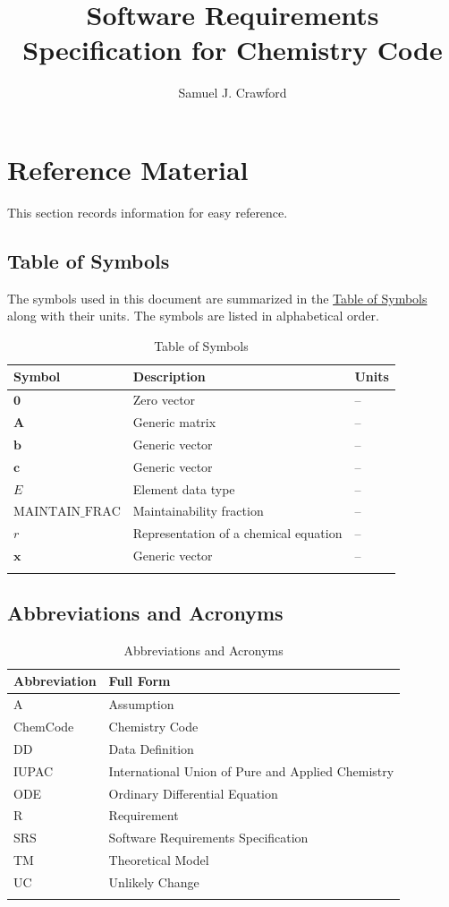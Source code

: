 \documentclass[12pt]{article}
\title{Software Requirements Specification for Chemistry Code}
\author{Samuel J. Crawford}
\begin{document}
\maketitle
\tableofcontents
\newpage
\section{Reference Material}
\label{Sec:RefMat}
This section records information for easy reference.

\subsection{Table of Symbols}
\label{Sec:ToS}
The symbols used in this document are summarized in the \hyperref[Table:ToS]{Table of Symbols} along with their units. The symbols are listed in alphabetical order.

\begin{longtable}{l l l}
\toprule
\textbf{Symbol} & \textbf{Description} & \textbf{Units}
\\
\midrule
\endhead
$\symbf{0}$ & Zero vector & --
\\
$\symbf{A}$ & Generic matrix & --
\\
$\symbf{b}$ & Generic vector & --
\\
$\symbf{c}$ & Generic vector & --
\\
$E$ & Element data type & --
\\
$\text{MAINTAIN_FRAC}$ & Maintainability fraction & --
\\
$r$ & Representation of a chemical equation & --
\\
$\symbf{x}$ & Generic vector & --
\\
\bottomrule
\caption{Table of Symbols}
\label{Table:ToS}
\end{longtable}
\subsection{Abbreviations and Acronyms}
\label{Sec:TAbbAcc}
\begin{longtable}{l l}
\toprule
\textbf{Abbreviation} & \textbf{Full Form}
\\
\midrule
\endhead
A & Assumption
\\
ChemCode & Chemistry Code
\\
DD & Data Definition
\\
IUPAC & International Union of Pure and Applied Chemistry
\\
ODE & Ordinary Differential Equation
\\
R & Requirement
\\
SRS & Software Requirements Specification
\\
TM & Theoretical Model
\\
UC & Unlikely Change
\\
\bottomrule
\caption{Abbreviations and Acronyms}
\label{Table:TAbbAcc}
\end{longtable}
\end{document}

